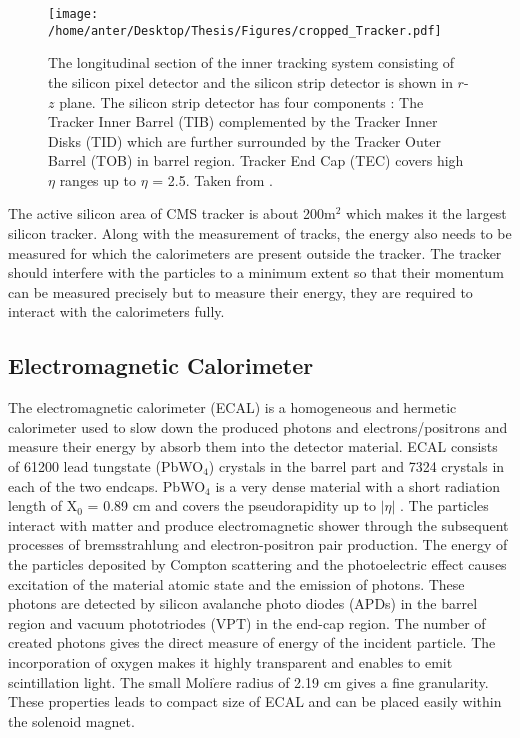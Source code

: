 \begin{figure}[!h]
\begin{center} 
\vspace*{2mm}
\hspace*{-6mm}
\texttt{[image: /home/anter/Desktop/Thesis/Figures/cropped\_Tracker.pdf]}\\
\caption[The longitudinal section of the inner tracking system.]{The longitudinal section of the inner tracking system consisting of the silicon pixel detector and the silicon strip detector is shown in $r$-$z$ plane. The silicon strip detector has four components : The Tracker Inner Barrel (TIB) complemented by the Tracker Inner Disks (TID) which are further surrounded by the Tracker Outer Barrel (TOB) in barrel region. Tracker End Cap (TEC) covers high $\eta$ ranges up to $\eta$ = 2.5. Taken from \cite{Chatrchyan:2008aa}.}
\label{fig:tracker}
\end{center}
\end{figure}
The active silicon area of CMS tracker is about 200m$^{2}$ which makes it the largest silicon tracker. Along with the measurement of tracks, the energy also needs to be measured for which the calorimeters are present outside the tracker. The tracker should interfere with the particles to a minimum extent so that their momentum can be measured precisely but to measure their energy, they are required to interact with the calorimeters fully.

\subsection{Electromagnetic Calorimeter}
The electromagnetic calorimeter (ECAL) is a homogeneous and hermetic calorimeter used to slow down the produced photons and electrons/positrons and measure their energy by absorb them into the detector material. ECAL consists of 61200 lead tungstate (PbWO$_4$) crystals in the barrel part and 7324 crystals in each of the two endcaps. PbWO$_4$ is a very dense material with a short radiation length of X$_0$ = 0.89 cm and covers the pseudorapidity up to $|\eta|$ . The particles interact with matter and produce electromagnetic shower through the subsequent processes of bremsstrahlung and electron-positron pair production. The energy of the particles deposited by Compton scattering and the photoelectric effect causes excitation of the material atomic state and the emission of photons. These photons are detected by silicon avalanche photo diodes (APDs) in the barrel region and vacuum phototriodes (VPT) in the end-cap region. The number of created photons gives the direct measure of energy of the incident particle. The incorporation of oxygen makes it highly transparent and enables to emit scintillation light. The small Moli$\grave{e}$re radius of 2.19 cm gives a fine granularity. These properties leads to compact size of ECAL and can be placed easily within the solenoid magnet. 

